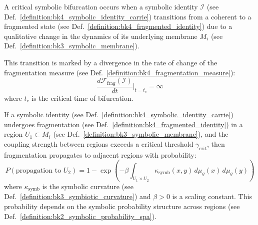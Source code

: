 \begin{definition} \label{definition:bk4_critical_symbolic_bifurc}
A critical symbolic bifurcation occurs when a symbolic identity $\mathcal{I}$ (see Def.~\ref{definition:bk4_symbolic_identity_carrie}) transitions from a coherent to a fragmented state (see Def.~\ref{definition:bk4_fragmented_identity}) due to a qualitative change in the dynamics of its underlying membrane $M_i$ (see Def.~\ref{definition:bk3_symbolic_membrane}).

This transition is marked by a divergence in the rate of change of the fragmentation measure (see Def.~\ref{definition:bk4_fragmentation_measure}):
\begin{equation}
    \frac{d\mathcal{F}_{\text{frag}}(\mathcal{I})}{dt}\Big|_{t=t_c} = \infty
\end{equation}
where $t_c$ is the critical time of bifurcation.
\end{definition}
\begin{lemma} \label{lemma:bk4_fragmentation_cascade}
If a symbolic identity (see Def.~\ref{definition:bk4_symbolic_identity_carrie}) undergoes fragmentation (see Def.~\ref{definition:bk4_fragmented_identity}) in a region $U_1 \subset M_i$ (see Def.~\ref{definition:bk3_symbolic_membrane}), and the coupling strength between regions exceeds a critical threshold $\gamma_{\text{crit}}$, then fragmentation propagates to adjacent regions with probability:
\begin{equation}
    P(\text{propagation to } U_2) = 1 - \exp\left(-\beta \int_{U_1 \times U_2} \kappa_{\text{symb}}(x,y) \, d\mu_g(x) \, d\mu_g(y)\right)
\end{equation}
where $\kappa_{\text{symb}}$ is the symbolic curvature (see Def.~\ref{definition:bk3_symbiotic_curvature}) and $\beta > 0$ is a scaling constant. This probability depends on the symbolic probability structure across regions (see Def.~\ref{definition:bk2_symbolic_probability_spa}).
\end{lemma}
